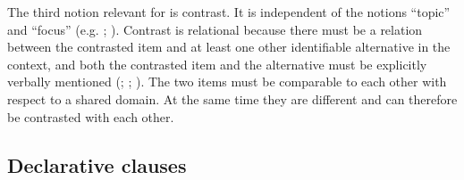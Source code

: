The third notion relevant for  is contrast. It is independent of the notions ``topic'' and ``focus'' (e.g. \citealt{Vallduvi.Vilkuna1998}; \citealt{Neeleman.etal2009}). Contrast is relational because there must be a relation between the contrasted item and at least one other identifiable alternative in the context, and both the contrasted item and the alternative must be explicitly verbally mentioned (\citealt{Malchukov2004}; \citealt{Izutsu2008}; \citealt{Repp2010}). The two items must be comparable to each other with respect to a shared domain. At the same time they are different and can therefore be contrasted with each other.



\subsection{Declarative clauses}
\label{ssec:Declarative clauses}

